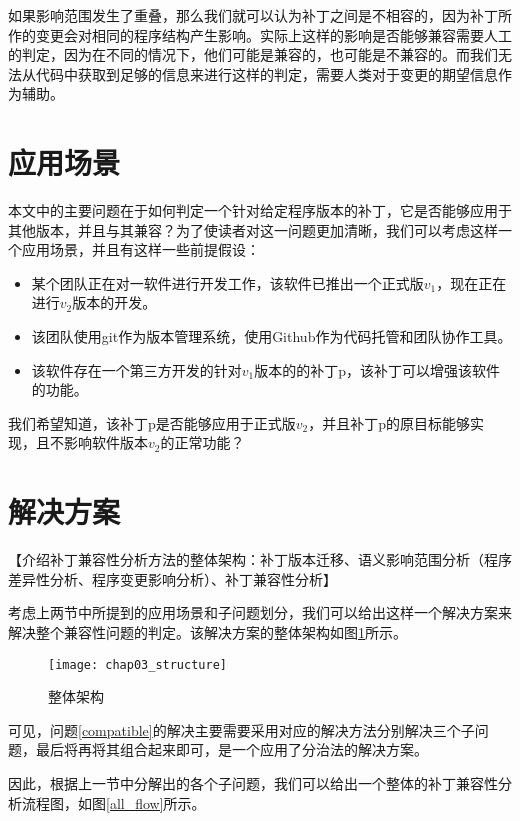 如果影响范围发生了重叠，那么我们就可以认为补丁之间是不相容的，因为补丁所作的变更会对相同的程序结构产生影响。实际上这样的影响是否能够兼容需要人工的判定，因为在不同的情况下，他们可能是兼容的，也可能是不兼容的。而我们无法从代码中获取到足够的信息来进行这样的判定，需要人类对于变更的期望信息作为辅助。

\section{应用场景}

本文中的主要问题在于如何判定一个针对给定程序版本的补丁，它是否能够应用于其他版本，并且与其兼容？为了使读者对这一问题更加清晰，我们可以考虑这样一个应用场景，并且有这样一些前提假设：

\begin{itemize}
	\item 某个团队正在对一软件进行开发工作，该软件已推出一个正式版$v_{1}$，现在正在进行$v_{2}$版本的开发。
	
	\item 该团队使用git作为版本管理系统，使用Github作为代码托管和团队协作工具。
	
	\item 该软件存在一个第三方开发的针对$v_{1}$版本的的补丁p，该补丁可以增强该软件的功能。
	
\end{itemize}

我们希望知道，该补丁p是否能够应用于正式版$v_{2}$，并且补丁p的原目标能够实现，且不影响软件版本$v_{2}$的正常功能？


\section{解决方案}
【介绍补丁兼容性分析方法的整体架构：补丁版本迁移、语义影响范围分析（程序差异性分析、程序变更影响分析）、补丁兼容性分析】

考虑上两节中所提到的应用场景和子问题划分，我们可以给出这样一个解决方案来解决整个兼容性问题的判定。该解决方案的整体架构如图\ref {structure}所示。

\begin{figure}[H]
	\centering
	\texttt{[image: chap03\_structure]}
	\caption {整体架构}	
	\label {structure}
\end{figure}

可见，问题\ref{compatible}的解决主要需要采用对应的解决方法分别解决三个子问题，最后将再将其组合起来即可，是一个应用了分治法的解决方案。

因此，根据上一节中分解出的各个子问题，我们可以给出一个整体的补丁兼容性分析流程图，如图\ref {all_flow}所示。

